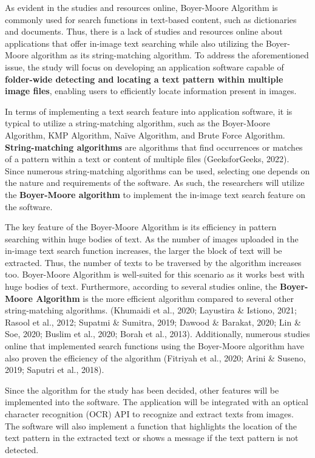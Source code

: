 \hfill

As evident in the studies and resources online, Boyer-Moore Algorithm is commonly used for search
functions in text-based content, such as dictionaries and documents. Thus, there is a lack of
studies and resources online about applications that offer in-image text searching while also
utilizing the Boyer-Moore algorithm as its string-matching algorithm. To address the aforementioned
issue, the study will focus on developing an application software capable of \textbf{folder-wide detecting
and locating a text pattern within multiple image files}, enabling users to efficiently locate
information present in images.

\hfill

In terms of implementing a text search feature into application software, it is typical to utilize a
string-matching algorithm, such as the Boyer-Moore Algorithm, KMP Algorithm, Naïve Algorithm, and
Brute Force Algorithm. \textbf{String-matching algorithms} are algorithms that find occurrences or matches of
a pattern within a text or content of multiple files (GeeksforGeeks, 2022). Since numerous
string-matching algorithms can be used, selecting one depends on the nature and requirements of the
software. As such, the researchers will utilize the \textbf{Boyer-Moore algorithm} to implement the in-image
text search feature on the software.

\hfill

The key feature of the Boyer-Moore Algorithm is its efficiency in pattern searching within huge
bodies of text. As the number of images uploaded in the in-image text search function increases, the
larger the block of text will be extracted. Thus, the number of texts to be traversed by the
algorithm increases too. Boyer-Moore Algorithm is well-suited for this scenario as it works best
with huge bodies of text. Furthermore, according to several studies online, the \textbf{Boyer-Moore
Algorithm} is the more efficient algorithm compared to several other string-matching algorithms.
(Khumaidi et al., 2020; Layustira \& Istiono, 2021; Rasool et al., 2012; Supatmi \& Sumitra, 2019;
Dawood \& Barakat, 2020; Lin \& Soe, 2020; Buslim et al., 2020; Borah et al., 2013). Additionally,
numerous studies online that implemented search functions using the Boyer-Moore algorithm have also
proven the efficiency of the algorithm (Fitriyah et al., 2020; Arini \& Suseno, 2019; Saputri et
al., 2018).

\hfill

Since the algorithm for the study has been decided, other features will be implemented into the
software. The application will be integrated with an optical character recognition (OCR) API to
recognize and extract texts from images. The software will also implement a function that highlights
the location of the text pattern in the extracted text or shows a message if the text pattern is not
detected.
